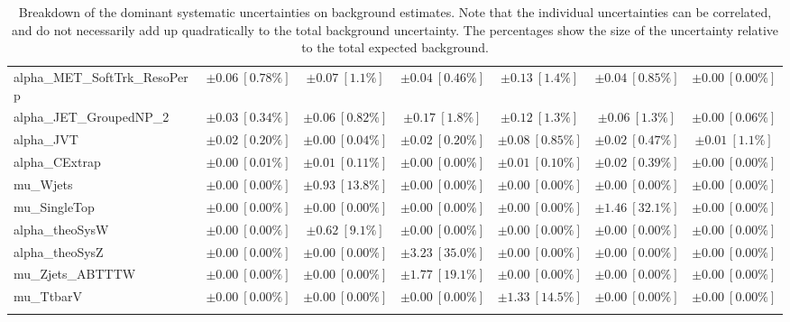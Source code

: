 \begin{sidewaystable}
\begin{center}
\begin{tabular*}{\textwidth}{@{\extracolsep{\fill}}lcccccc}
alpha\_MET\_SoftTrk\_ResoPerp         & $\pm 0.06\ [0.78\%] $          & $\pm 0.07\ [1.1\%] $          & $\pm 0.04\ [0.46\%] $          & $\pm 0.13\ [1.4\%] $          & $\pm 0.04\ [0.85\%] $          & $\pm 0.00\ [0.00\%] $       \\
alpha\_JET\_GroupedNP\_2         & $\pm 0.03\ [0.34\%] $          & $\pm 0.06\ [0.82\%] $          & $\pm 0.17\ [1.8\%] $          & $\pm 0.12\ [1.3\%] $          & $\pm 0.06\ [1.3\%] $          & $\pm 0.00\ [0.06\%] $       \\
alpha\_JVT         & $\pm 0.02\ [0.20\%] $          & $\pm 0.00\ [0.04\%] $          & $\pm 0.02\ [0.20\%] $          & $\pm 0.08\ [0.85\%] $          & $\pm 0.02\ [0.47\%] $          & $\pm 0.01\ [1.1\%] $       \\
alpha\_CExtrap         & $\pm 0.00\ [0.01\%] $          & $\pm 0.01\ [0.11\%] $          & $\pm 0.00\ [0.00\%] $          & $\pm 0.01\ [0.10\%] $          & $\pm 0.02\ [0.39\%] $          & $\pm 0.00\ [0.00\%] $       \\
mu\_Wjets         & $\pm 0.00\ [0.00\%] $          & $\pm 0.93\ [13.8\%] $          & $\pm 0.00\ [0.00\%] $          & $\pm 0.00\ [0.00\%] $          & $\pm 0.00\ [0.00\%] $          & $\pm 0.00\ [0.00\%] $       \\
mu\_SingleTop         & $\pm 0.00\ [0.00\%] $          & $\pm 0.00\ [0.00\%] $          & $\pm 0.00\ [0.00\%] $          & $\pm 0.00\ [0.00\%] $          & $\pm 1.46\ [32.1\%] $          & $\pm 0.00\ [0.00\%] $       \\
alpha\_theoSysW         & $\pm 0.00\ [0.00\%] $          & $\pm 0.62\ [9.1\%] $          & $\pm 0.00\ [0.00\%] $          & $\pm 0.00\ [0.00\%] $          & $\pm 0.00\ [0.00\%] $          & $\pm 0.00\ [0.00\%] $       \\
alpha\_theoSysZ         & $\pm 0.00\ [0.00\%] $          & $\pm 0.00\ [0.00\%] $          & $\pm 3.23\ [35.0\%] $          & $\pm 0.00\ [0.00\%] $          & $\pm 0.00\ [0.00\%] $          & $\pm 0.00\ [0.00\%] $       \\
mu\_Zjets\_ABTTTW         & $\pm 0.00\ [0.00\%] $          & $\pm 0.00\ [0.00\%] $          & $\pm 1.77\ [19.1\%] $          & $\pm 0.00\ [0.00\%] $          & $\pm 0.00\ [0.00\%] $          & $\pm 0.00\ [0.00\%] $       \\
mu\_TtbarV         & $\pm 0.00\ [0.00\%] $          & $\pm 0.00\ [0.00\%] $          & $\pm 0.00\ [0.00\%] $          & $\pm 1.33\ [14.5\%] $          & $\pm 0.00\ [0.00\%] $          & $\pm 0.00\ [0.00\%] $       \\
\noalign{\smallskip}\hline\noalign{\smallskip}
\end{tabular*}
\end{center}
\caption[Breakdown of uncertainty on background estimates]{
Breakdown of the dominant systematic uncertainties on background estimates.
Note that the individual uncertainties can be correlated, and do not necessarily add up quadratically to 
the total background uncertainty. The percentages show the size of the uncertainty relative to the total expected background.
\label{table.results.bkgestimate.uncertainties.SRB_TT_bybkg}}
\end{sidewaystable}
%
